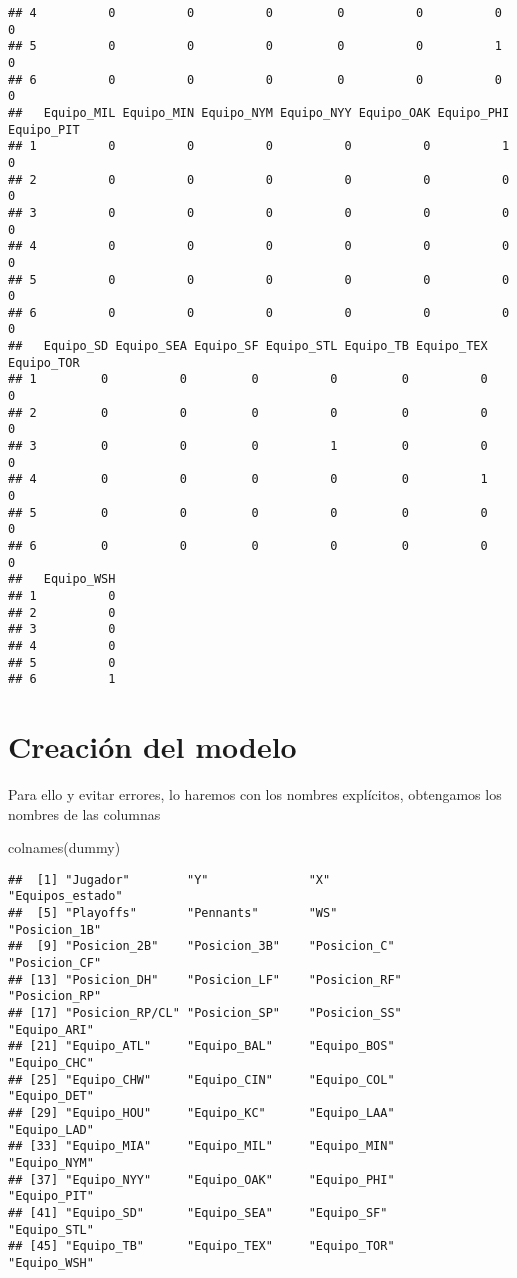 \documentclass[
]{article}
\newenvironment{Shaded}{\begin{snugshade}}{\end{snugshade}}
\newcommand{\FunctionTok}[1]{\textcolor[rgb]{0.00,0.00,0.00}{#1}}
\newcommand{\NormalTok}[1]{#1}
\begin{document}
\begin{verbatim}
## 4          0          0          0         0          0          0          0
## 5          0          0          0         0          0          1          0
## 6          0          0          0         0          0          0          0
##   Equipo_MIL Equipo_MIN Equipo_NYM Equipo_NYY Equipo_OAK Equipo_PHI Equipo_PIT
## 1          0          0          0          0          0          1          0
## 2          0          0          0          0          0          0          0
## 3          0          0          0          0          0          0          0
## 4          0          0          0          0          0          0          0
## 5          0          0          0          0          0          0          0
## 6          0          0          0          0          0          0          0
##   Equipo_SD Equipo_SEA Equipo_SF Equipo_STL Equipo_TB Equipo_TEX Equipo_TOR
## 1         0          0         0          0         0          0          0
## 2         0          0         0          0         0          0          0
## 3         0          0         0          1         0          0          0
## 4         0          0         0          0         0          1          0
## 5         0          0         0          0         0          0          0
## 6         0          0         0          0         0          0          0
##   Equipo_WSH
## 1          0
## 2          0
## 3          0
## 4          0
## 5          0
## 6          1
\end{verbatim}

\section{Creación del modelo}

Para ello y evitar errores, lo haremos con los nombres explícitos,
obtengamos los nombres de las columnas

\begin{Shaded}
\begin{Highlighting}[]
\FunctionTok{colnames}\NormalTok{(dummy)}
\end{Highlighting}
\end{Shaded}

\begin{verbatim}
##  [1] "Jugador"        "Y"              "X"              "Equipos_estado"
##  [5] "Playoffs"       "Pennants"       "WS"             "Posicion_1B"   
##  [9] "Posicion_2B"    "Posicion_3B"    "Posicion_C"     "Posicion_CF"   
## [13] "Posicion_DH"    "Posicion_LF"    "Posicion_RF"    "Posicion_RP"   
## [17] "Posicion_RP/CL" "Posicion_SP"    "Posicion_SS"    "Equipo_ARI"    
## [21] "Equipo_ATL"     "Equipo_BAL"     "Equipo_BOS"     "Equipo_CHC"    
## [25] "Equipo_CHW"     "Equipo_CIN"     "Equipo_COL"     "Equipo_DET"    
## [29] "Equipo_HOU"     "Equipo_KC"      "Equipo_LAA"     "Equipo_LAD"    
## [33] "Equipo_MIA"     "Equipo_MIL"     "Equipo_MIN"     "Equipo_NYM"    
## [37] "Equipo_NYY"     "Equipo_OAK"     "Equipo_PHI"     "Equipo_PIT"    
## [41] "Equipo_SD"      "Equipo_SEA"     "Equipo_SF"      "Equipo_STL"    
## [45] "Equipo_TB"      "Equipo_TEX"     "Equipo_TOR"     "Equipo_WSH"
\end{verbatim}
\end{document}

